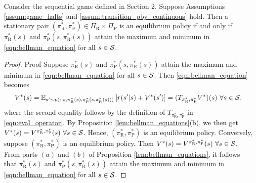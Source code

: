 \documentclass[opre,dblanonrev]{informs4}
\begin{document}
\begin{APPENDICES}
       \begin{proposition}
           \label{lem:stationary_pol_optimal}
           Consider the sequential game defined in Section 2. Suppose Assumptions \ref{assum:game_halts} and \ref{assum:transition_pby_continuous} hold. Then a stationary pair $(\pi_\text{R}^*,\pi_\text{P}^*) \in \Pi_\text{R} \times \Pi_\text{P}$ is an equilibrium policy if and only if $\pi_\text{R}^*(s)$ and $\pi_\text{P}^*(s,\pi_\text{R}^*(s))$ attain the maximum and minimum in \eqref{eqn:bellman_equation} for all $s \in {\cal S}$.
       \end{proposition}
       \begin{proof}{Proof}
           Suppose $\pi_\text{R}^*(s)$ and $\pi_\text{P}^*(s,\pi_\text{R}^*(s))$ attain the maximum and minimum in \eqref{eqn:bellman_equation} for all $s \in {\cal S}$. Then \eqref{eqn:bellman_equation} becomes
           \[
           V^*(s) = \mathbb{E}_{s' \sim p(\cdot|s,\pi_\text{R}^*(s),\pi_\text{P}^*(s,\pi_\text{R}^*(s)))}\left[r(s'|s) + V^*(s')\right] = (T_{\pi_\text{R}^*,\pi_\text{P}^*}V^*)(s)  \ \forall s \in {\cal S},
           \]
           where the second equality follows by the definition of $T_{\pi_\text{R}^*,\pi_\text{P}^*}$ in \eqref{eqn:eval_operator}. By Proposition  \ref{lem:bellman_equations}(b), we then get $V^*(s)=V^{\pi_\text{R}^*,\pi_\text{P}^*}(s) \ \forall s \in {\cal S}$. Hence, $(\pi_\text{R}^*,\pi_\text{P}^*)$ is an equilibrium policy. Conversely, suppose $(\pi_\text{R}^*,\pi_\text{P}^*)$ is an equilibrium policy. Then $V^*(s) = V^{\pi_\text{R}^*,\pi_\text{P}^*}(s) \ \forall s \in {\cal S}$. From parts $(a)$ and $(b)$ of Proposition   \ref{lem:bellman_equations}, it follows that $\pi_\text{R}^*(s)$ and $\pi_\text{P}^*(s,\pi_\text{R}^*(s))$ attain the maximum and minimum in \eqref{eqn:bellman_equation} for all $s \in {\cal S}$.\Halmos
       \end{proof}
    

\end{APPENDICES}
\end{document}

